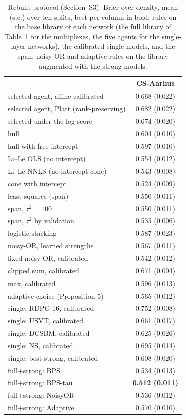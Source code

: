 \documentclass[12pt]{article}
\begin{document}
\begin{table}[htbp]
\centering
\caption{Rebuilt protocol (Section~S3): Brier over density, mean (s.e.) over ten splits, best per column in bold; rules on the base library of each network (the full library of Table~1 for the multiplexes, the five agents for the single-layer networks), the calibrated single models, and the span, noisy-OR and adaptive rules on the library augmented with the strong models.}
\label{tab:v2}
\footnotesize\setlength{\tabcolsep}{4pt}
\begin{tabular}{lc}
\toprule
 & CS-Aarhus \\
\midrule
selected agent, affine-calibrated & 0.668 (0.022) \\
selected agent, Platt (rank-preserving) & 0.682 (0.022) \\
selected under the log score & 0.674 (0.020) \\
hull & 0.604 (0.010) \\
hull with free intercept & 0.597 (0.010) \\
Li--Le OLS (no intercept) & 0.554 (0.012) \\
Li--Le NNLS (no-intercept cone) & 0.543 (0.008) \\
cone with intercept & 0.524 (0.009) \\
least squares (span) & 0.550 (0.011) \\
span, $\tau^2=100$ & 0.550 (0.011) \\
span, $\tau^2$ by validation & 0.535 (0.006) \\
logistic stacking & 0.587 (0.023) \\
noisy-OR, learned strengths & 0.567 (0.011) \\
fixed noisy-OR, calibrated & 0.542 (0.012) \\
clipped sum, calibrated & 0.671 (0.004) \\
max, calibrated & 0.596 (0.013) \\
adaptive choice (Proposition 5) & 0.565 (0.012) \\
single: RDPG-16, calibrated & 0.752 (0.008) \\
single: USVT, calibrated & 0.661 (0.017) \\
single: DCSBM, calibrated & 0.625 (0.026) \\
single: NS, calibrated & 0.695 (0.014) \\
single: best-strong, calibrated & 0.608 (0.020) \\
full+strong: BPS & 0.534 (0.013) \\
full+strong: BPS-tau & \textbf{0.512 (0.011)} \\
full+strong: NoisyOR & 0.536 (0.012) \\
full+strong: Adaptive & 0.570 (0.010) \\
\bottomrule
\end{tabular}

\end{table}
\end{document}
